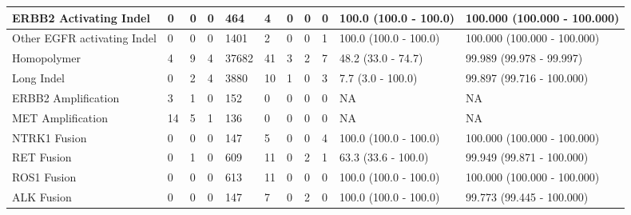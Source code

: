 \begin{tabular}{|l|l|l|l|l|l|l|l|l|l|l|}
ERBB2 Activating Indel      &      0 &      0 &      0 &    464 &      4 &      0 &      0 &      0 &  100.0 (100.0 - 100.0) &  100.000 (100.000 - 100.000) \\ \hline
Other EGFR activating Indel &      0 &      0 &      0 &   1401 &      2 &      0 &      0 &      1 &  100.0 (100.0 - 100.0) &  100.000 (100.000 - 100.000) \\ \hline
Homopolymer                 &      4 &      9 &      4 &  37682 &     41 &      3 &      2 &      7 &     48.2 (33.0 - 74.7) &     99.989 (99.978 - 99.997) \\ \hline
Long Indel                  &      0 &      2 &      4 &   3880 &     10 &      1 &      0 &      3 &      7.7 (3.0 - 100.0) &    99.897 (99.716 - 100.000) \\ \hline
ERBB2 Amplification         &      3 &      1 &      0 &    152 &      0 &      0 &      0 &      0 &                     NA &                           NA \\ \hline
MET Amplification           &     14 &      5 &      1 &    136 &      0 &      0 &      0 &      0 &                     NA &                           NA \\ \hline
NTRK1 Fusion                &      0 &      0 &      0 &    147 &      5 &      0 &      0 &      4 &  100.0 (100.0 - 100.0) &  100.000 (100.000 - 100.000) \\ \hline
RET Fusion                  &      0 &      1 &      0 &    609 &     11 &      0 &      2 &      1 &    63.3 (33.6 - 100.0) &    99.949 (99.871 - 100.000) \\ \hline
ROS1 Fusion                 &      0 &      0 &      0 &    613 &     11 &      0 &      0 &      0 &  100.0 (100.0 - 100.0) &  100.000 (100.000 - 100.000) \\ \hline
ALK Fusion                  &      0 &      0 &      0 &    147 &      7 &      0 &      2 &      0 &  100.0 (100.0 - 100.0) &    99.773 (99.445 - 100.000) \\ \hline
\end{tabular}